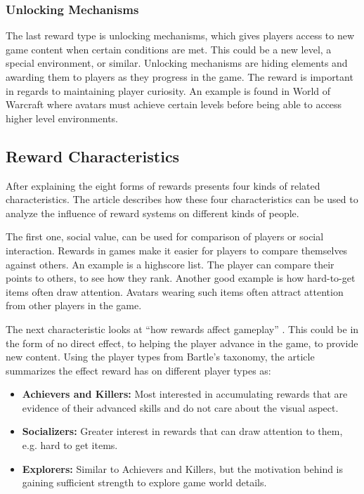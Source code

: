 \documentclass[../Main.tex]{subfiles}
\begin{document}
\subsubsection{Unlocking Mechanisms}
The last reward type is unlocking mechanisms, which gives players access to new game content when certain conditions are met. This could be a new level, a special environment, or similar. Unlocking mechanisms are hiding elements and awarding them to players as they progress in the game. The reward is important in regards to maintaining player curiosity. An example is found in World of Warcraft where avatars must achieve certain levels before being able to access higher level environments.

\subsection{Reward Characteristics}
After explaining the eight forms of rewards \citeauthor{wang_game_2011} presents four kinds of related characteristics. The article describes how these four characteristics can be used to analyze the influence of reward systems on different kinds of people.

The first one, social value, can be used for comparison of players or social interaction. Rewards in games make it easier for players to compare themselves against others. An example is a highscore list. The player can compare their points to others, to see how they rank. Another good example is how hard-to-get items often draw attention. Avatars wearing such items often attract attention from other players in the game.

The next characteristic looks at “how rewards affect gameplay” \cite{wang_game_2011}. This could be in the form of no direct effect, to helping the player advance in the game, to provide new content. Using the player types from Bartle’s taxonomy, the article summarizes the effect reward has on different player types as:

\begin{itemize}
    \item \textbf{Achievers and Killers:} Most interested in accumulating rewards that are evidence of their advanced skills and do not care about the visual aspect.
    \item \textbf{Socializers:} Greater interest in rewards that can draw attention to them, e.g. hard to get items.
    \item \textbf{Explorers:} Similar to Achievers and Killers, but the motivation behind is gaining sufficient strength to explore game world details.
\end{itemize}
\end{document}
